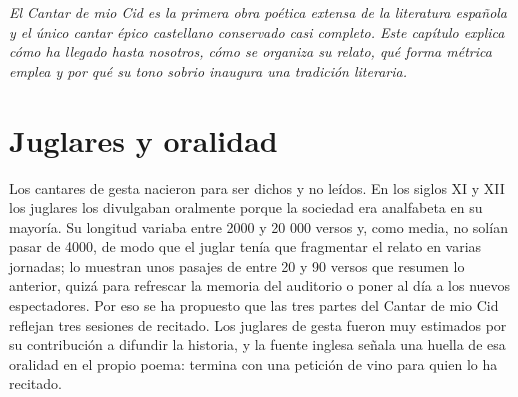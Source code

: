 \documentclass{book}
\begin{document}
\noindent\textit{El Cantar de mio Cid es la primera obra poética extensa de la literatura española y el único cantar épico castellano conservado casi completo. Este capítulo explica cómo ha llegado hasta nosotros, cómo se organiza su relato, qué forma métrica emplea y por qué su tono sobrio inaugura una tradición literaria.}


\section{Juglares y oralidad}

Los cantares de gesta nacieron para ser dichos y no leídos. En los siglos XI y XII los juglares los divulgaban oralmente porque la sociedad era analfabeta en su mayoría. Su longitud variaba entre 2000 y 20 000 versos y, como media, no solían pasar de 4000, de modo que el juglar tenía que fragmentar el relato en varias jornadas; lo muestran unos pasajes de entre 20 y 90 versos que resumen lo anterior, quizá para refrescar la memoria del auditorio o poner al día a los nuevos espectadores. Por eso se ha propuesto que las tres partes del Cantar de mio Cid reflejan tres sesiones de recitado. Los juglares de gesta fueron muy estimados por su contribución a difundir la historia, y la fuente inglesa señala una huella de esa oralidad en el propio poema: termina con una petición de vino para quien lo ha recitado.

\end{document}
